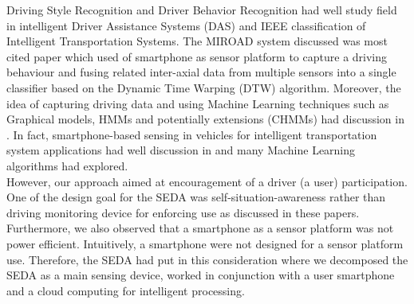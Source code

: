 Driving Style Recognition and Driver Behavior Recognition had well study field in intelligent Driver Assistance Systems (DAS) and IEEE classification of Intelligent Transportation Systems. The MIROAD  \cite{johnson2011driving} system discussed was most cited paper which used of smartphone as sensor platform to capture a driving behaviour and fusing related inter-axial data from multiple sensors into a single classifier based on the Dynamic Time Warping (DTW) algorithm. Moreover, the idea of capturing driving data and using Machine Learning techniques such as Graphical models, HMMs and potentially extensions (CHMMs) had discussion in \cite{oliver2000graphical}. In fact, smartphone-based sensing in vehicles for intelligent transportation system applications had well discussion in \cite{fill1, fill2, fill3, fill4, fill5, fill6} and many Machine Learning algorithms had explored. 
\\
However, our approach aimed at encouragement of a driver (a user) participation. One of the design goal for the SEDA was self-situation-awareness rather than driving monitoring device for enforcing use as discussed in these papers. Furthermore, we also observed that a smartphone as a sensor platform was not power efficient. Intuitively, a smartphone were not designed for a sensor platform use. Therefore, the SEDA had put in this consideration where we decomposed the SEDA as a main sensing device, worked in conjunction with a user smartphone and a cloud computing for intelligent processing.
\\

